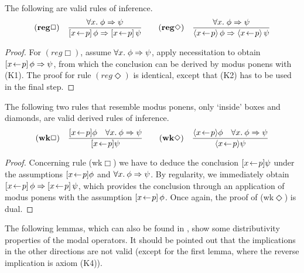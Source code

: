 \begin{lem}[Regularity] \label{thm:regular}
  The following are valid rules of inference.
\[
  \NRule{reg\Box}{\forall x\bnd \phi \Rightarrow \psi}{\PDLBox{x\leteq p}{\phi} \Rightarrow \PDLBox{x\leteq p}{\psi}}
  \qquad
  \NRule{reg\Diamond}{\forall x\bnd \phi \Rightarrow \psi}{\PDLDmd{x\leteq p}{\phi} \Rightarrow \PDLDmd{x\leteq p}{\psi}}
\]
\end{lem}
\begin{proof}
  For $(reg\Box)$, assume $\forall x.\; \phi \Rightarrow \psi$, apply necessitation to obtain
  $[x\!\gets\! p]\,{\phi\Rightarrow\psi}$, from which the conclusion can be derived by modus
  ponens with (K1). The proof for rule $(reg\Diamond)$ is identical, except that (K2)
  has to be used in the final step.
\end{proof}


\begin{lem} \label{thm:wkbox-wkdmd}
  The following two rules that resemble modus ponens, only `inside'
  boxes and diamonds, are valid derived rules of inference.
\[
  \NRule{wk\Box}{[\xp]\phi \quad \forall x\bdot \phi \Rightarrow \psi}{[\xp] \psi}
  \qquad
  \NRule{wk\Diamond}{\langle\xp\rangle \phi \quad \forall x\bdot \phi \Rightarrow \psi }{\langle\xp\rangle \psi}
\]
\end{lem}
\begin{proof}
  Concerning  rule (wk$\Box$) we have to deduce the conclusion $[x \!\gets\! p]\psi$ under the
  assumptions $[x \!\gets\! p]\phi$ and $\forall x.\: \phi \Rightarrow \psi$. By regularity, we immediately
  obtain $[x\!\gets\! p]\,{\phi}  \Rightarrow [x\!\gets\! p]\,{\psi}$, which provides the
  conclusion through an application of modus ponens with the assumption
  $[x\!\gets\! p]\,{\phi}$. Once again, the proof of (wk$\Diamond$) is dual.
\end{proof}

The following lemmas, which can also be found in \cite{HarelKozen02}, show some
distributivity properties of the modal operators.  It should be pointed out that
the implications in the other directions are not valid (except for the first
lemma, where the reverse implication is axiom (K4)).

